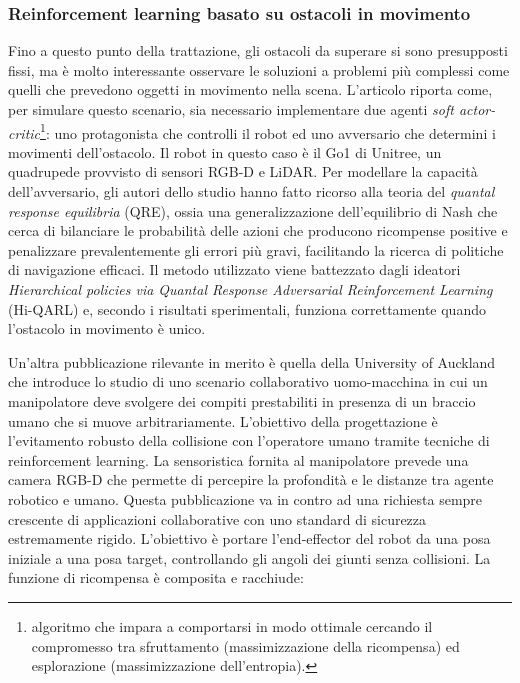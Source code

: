 \subsubsection{Reinforcement learning basato su ostacoli in movimento}
Fino a questo punto della trattazione, gli ostacoli da superare si sono presupposti fissi, ma è molto interessante osservare le soluzioni a problemi più complessi come quelli che prevedono oggetti in movimento nella scena. L'articolo \cite{holgadoalvarez2025dynamicobstacleavoidancebounded} riporta come, per simulare questo scenario, sia necessario implementare due agenti \textit{soft actor-critic}\footnote{algoritmo che impara a comportarsi in modo ottimale cercando il compromesso tra sfruttamento (massimizzazione della ricompensa) ed esplorazione (massimizzazione dell'entropia).}: uno protagonista che controlli il robot ed uno avversario che determini i movimenti dell'ostacolo. Il robot in questo caso è il Go1 di Unitree, un quadrupede provvisto di sensori RGB-D e LiDAR. Per modellare la capacità dell'avversario, gli autori dello studio hanno fatto ricorso alla teoria del \textit{quantal response equilibria} (QRE), ossia una generalizzazione dell'equilibrio di Nash che cerca di bilanciare le probabilità delle azioni che producono ricompense positive e penalizzare prevalentemente gli errori più gravi, facilitando la ricerca di politiche di navigazione efficaci. Il metodo utilizzato viene battezzato dagli ideatori \textit{Hierarchical policies via Quantal Response Adversarial Reinforcement Learning} (Hi-QARL) e, secondo i risultati sperimentali, funziona correttamente quando l'ostacolo in movimento è unico.

Un'altra pubblicazione rilevante in merito è quella della University of Auckland \cite{xia2024deep} che introduce lo studio di uno scenario collaborativo uomo-macchina in cui un manipolatore deve svolgere dei compiti prestabiliti in presenza di un braccio umano che si muove arbitrariamente. L'obiettivo della progettazione è l'evitamento robusto della collisione con l'operatore umano tramite tecniche di reinforcement learning. La sensoristica fornita al manipolatore prevede una camera RGB-D che permette di percepire la profondità e le distanze tra agente robotico e umano. Questa pubblicazione va in contro ad una richiesta sempre crescente di applicazioni collaborative con uno standard di sicurezza estremamente rigido. L'obiettivo è portare l'end-effector del robot da una posa iniziale a una posa target, controllando gli angoli dei giunti senza collisioni. La funzione di ricompensa è composita e racchiude:

